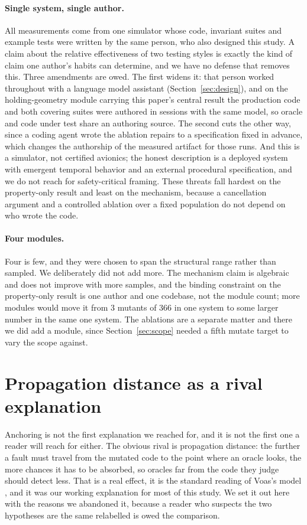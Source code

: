 \documentclass[12pt]{article}
\begin{document}
\paragraph{Single system, single author.} All measurements come from one
simulator whose code, invariant suites and example tests were written by the same
person, who also designed this study. A claim about the relative effectiveness of
two testing styles is exactly the kind of claim one author's habits can
determine, and we have no defense that removes this. Three amendments are owed.
The first widens it: that person worked throughout with a language model assistant
(Section~\ref{sec:design}), and on the holding-geometry module carrying this
paper's central result the production code and both covering suites were authored
in sessions with the same model, so oracle and code under test share an authoring
source. The second cuts the other way, since a coding agent wrote the ablation
repairs to a specification fixed in advance, which changes the authorship of the
measured artifact for those runs. And this is
a simulator, not certified avionics; the honest description is a deployed system
with emergent temporal behavior and an external procedural specification, and we
do not reach for safety-critical framing. These threats fall hardest on the property-only result and least on the mechanism, because a cancellation
argument and a controlled ablation over a fixed population do not depend on who
wrote the code.

\paragraph{Four modules.} Four is few, and they were chosen to span the
structural range rather than sampled. We deliberately did not add more. The
mechanism claim is algebraic and does not improve with more samples, and the binding constraint on the property-only result is one author and one
codebase, not the module count; more modules would move it from 3 mutants of
366 in one system to some larger number in the same one system. The ablations are
a separate matter and there we did add a module, since
Section~\ref{sec:scope} needed a fifth mutate target to vary the scope against.

\section{Propagation distance as a rival explanation}
\label{sec:distance}

Anchoring is not the first explanation we reached for, and it is not the first
one a reader will reach for either. The obvious rival is propagation distance:
the further a fault must travel from the mutated code to the point where an
oracle looks, the more chances it has to be absorbed, so oracles far from the
code they judge should detect less. That is a real effect, it is the standard
reading of Voas's model \cite{voas1992}, and it was our working explanation for
most of this study. We set it out here with the reasons we abandoned it, because
a reader who suspects the two hypotheses are the same relabelled is owed the comparison.
\end{document}
